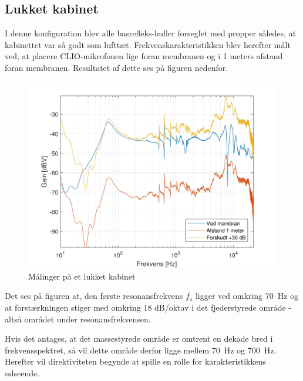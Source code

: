 \subsection{Lukket kabinet}
I denne konfiguration blev alle basrefleks-huller forseglet med propper således, at kabinettet var så godt som lufttæt. Frekvenskarakteristikken blev herefter målt ved, at placere CLIO-mikrofonen lige foran membranen og i 1 meters afstand foran membranen. Resultatet af dette ses på figuren nedenfor. 
\begin{figure}[H]
	\centering
	\vspace{-12pt}
	\includegraphics[width=\textwidth]{Pics/ClosedCabinet}
	\caption{Målinger på et lukket kabinet}
\end{figure}

Det ses på figuren at, den første resonansfrekvens $f_s$ ligger ved omkring \SI{70}{\hertz} og at forstærkningen stiger med omkring 18 dB/oktav i det fjederstyrede område - altså området under resonansfrekvensen.

Hvis det antages, at det massestyrede område er omtrent en dekade bred i frekvensspektret, så vil dette område derfor ligge mellem \SI{70}{\hertz} og \SI{700}{\hertz}. Herefter vil direktiviteten begynde at spille en rolle for karakteristikkens udseende.
 
